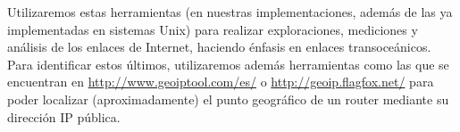 
Utilizaremos estas herramientas (en nuestras implementaciones, además de las ya implementadas en sistemas Unix) para realizar exploraciones, mediciones y an\'alisis de los enlaces de Internet, haciendo énfasis en enlaces transoceánicos. Para identificar estos últimos, utilizaremos además herramientas como las que se encuentran en \url{http://www.geoiptool.com/es/} o \url{http://geoip.flagfox.net/} para poder localizar (aproximadamente) el punto geogr\'afico de un router mediante su dirección IP pública.

